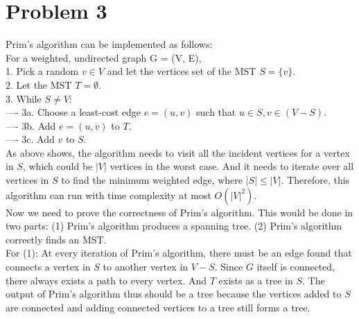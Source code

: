 \documentclass[titlepage, paper=a4, fontsize=11pt]{scrartcl} %
\numberwithin{equation}{section} %
\numberwithin{figure}{section} %
\numberwithin{table}{section} %
\numberwithin{figure}{section}
\begin{document}
\section*{Problem 3}
Prim's algorithm can be implemented as follows: \\
For a weighted, undirected graph G = (V, E), \\
1. Pick a random $v \in V$ and let the vertices set of the MST $S=\{v\}$. \\
2. Let the MST $T=\emptyset$. \\
3. While $S \neq V$: \\
---- 3a. Choose a least-cost edge $e=(u,v)$ such that $u \in S, v \in (V-S)$. \\
---- 3b. Add $e=(u,v)$ to $T$. \\
---- 3c. Add $v$ to $S$. \\

As above shows, the algorithm needs to visit all the incident vertices for a vertex in $S$, which could be $|V|$ vertices in the worst case. And it needs to iterate over all vertices in $S$ to find the minimum weighted edge, where $|S| \leq |V|$. Therefore, this algorithm can run with time complexity at most $O(|V|^2)$. \\

Now we need to prove the correctness of Prim's algorithm. This would be done in two parts: (1) Prim's algorithm produces a spanning tree. (2) Prim's algorithm correctly finds an MST. \\

For (1): At every iteration of Prim's algorithm, there must be an edge found that connects a vertex in $S$ to another vertex in $V-S$. Since $G$ itself is connected, there always exists a path to every vertex. And $T$ exists as a tree in $S$. The output of Prim's algorithm thus should be a tree because the vertices added to $S$ are connected and adding connected vertices to a tree still forms a tree. \\
\end{document}

